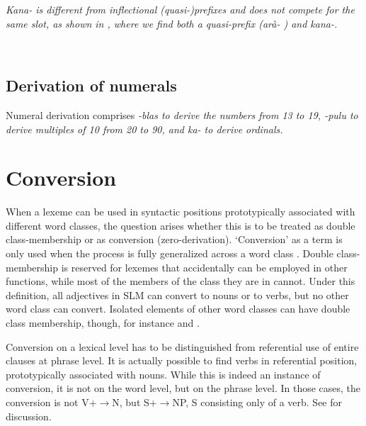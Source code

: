 
\em Kana- \em is different from inflectional (quasi-)prefixes and does not compete for the same slot, as shown in , where we find both a quasi-prefix (\em arà- \em) and \em kana-\em.

 \\


\subsection{Derivation of numerals}\label{sec:wofo:Derivationofnumerals}
Numeral derivation comprises \em -blas \em to derive the numbers from 13 to 19, \em -pulu \em to derive  multiples of 10 from 20 to 90, and \em ka- \em to derive ordinals.




\section{Conversion}\label{sec:wofo:Conversion}
When a lexeme can be used in syntactic positions prototypically associated with different word classes, the question arises whether this is to be treated as double class-membership or as conversion (zero-derivation). `Conversion' as a term is only used when the process is fully generalized across a word class \citep{abc}. Double class-membership is reserved for lexemes that accidentally can be employed in other functions, while most of the members of the class they are in cannot. Under this definition, all adjectives in SLM can convert to nouns or to verbs, but no other word class can convert. Isolated elements of other word classes can have double class membership, though, for instance  and .

Conversion on a lexical level has to be distinguished from referential use of entire clauses at phrase level. It is actually possible to find verbs in referential position, prototypically associated with nouns. While this is indeed an instance of conversion, it is not on the word level, but on the phrase level. In those cases, the conversion is not 
 V+\zero$\to$N, but S+\zero$\to$NP, S consisting only of a verb. See  for discussion.
 
